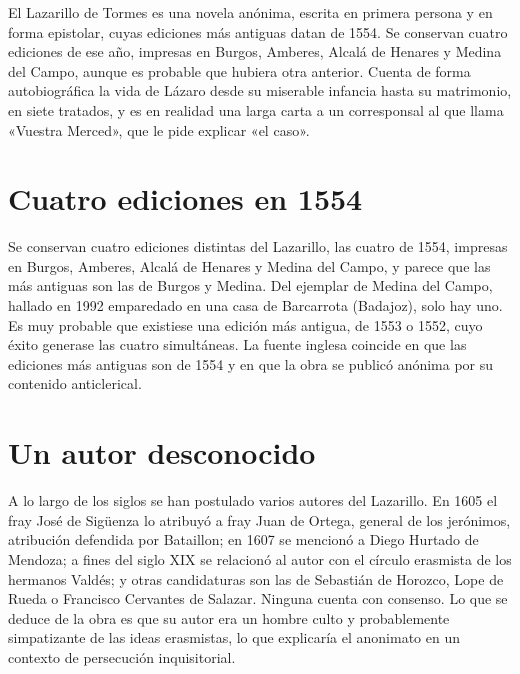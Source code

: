 \documentclass{book}
\begin{document}
El Lazarillo de Tormes es una novela anónima, escrita en primera persona y en forma epistolar, cuyas ediciones más antiguas datan de 1554. Se conservan cuatro ediciones de ese año, impresas en Burgos, Amberes, Alcalá de Henares y Medina del Campo, aunque es probable que hubiera otra anterior. Cuenta de forma autobiográfica la vida de Lázaro desde su miserable infancia hasta su matrimonio, en siete tratados, y es en realidad una larga carta a un corresponsal al que llama «Vuestra Merced», que le pide explicar «el caso».


\section{Cuatro ediciones en 1554}

Se conservan cuatro ediciones distintas del Lazarillo, las cuatro de 1554, impresas en Burgos, Amberes, Alcalá de Henares y Medina del Campo, y parece que las más antiguas son las de Burgos y Medina. Del ejemplar de Medina del Campo, hallado en 1992 emparedado en una casa de Barcarrota (Badajoz), solo hay uno. Es muy probable que existiese una edición más antigua, de 1553 o 1552, cuyo éxito generase las cuatro simultáneas. La fuente inglesa coincide en que las ediciones más antiguas son de 1554 y en que la obra se publicó anónima por su contenido anticlerical.


\section{Un autor desconocido}

A lo largo de los siglos se han postulado varios autores del Lazarillo. En 1605 el fray José de Sigüenza lo atribuyó a fray Juan de Ortega, general de los jerónimos, atribución defendida por Bataillon; en 1607 se mencionó a Diego Hurtado de Mendoza; a fines del siglo XIX se relacionó al autor con el círculo erasmista de los hermanos Valdés; y otras candidaturas son las de Sebastián de Horozco, Lope de Rueda o Francisco Cervantes de Salazar. Ninguna cuenta con consenso. Lo que se deduce de la obra es que su autor era un hombre culto y probablemente simpatizante de las ideas erasmistas, lo que explicaría el anonimato en un contexto de persecución inquisitorial.
\end{document}
